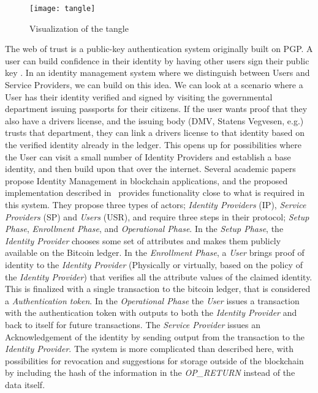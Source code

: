 \begin{figure}[h]
    \centering
    \texttt{[image: tangle]}
    \caption{Visualization of the tangle \cite{IOTA_Whitepaper}}
    \label{fig:tangle}
\end{figure}
The web of trust is a public-key authentication system originally built on PGP. A user can build confidence in their identity by having other users sign their public key \cite{Azouvi2017}. In an identity management system where we distinguish between Users and Service Providers, we can build on this idea. We can look at a scenario where a User has their identity verified and signed by visiting the governmental department issuing passports for their citizens. If the user wants proof that they also have a drivers license, and the issuing body (DMV, Statens Vegvesen, e.g.) trusts that department, they can link a drivers license to that identity based on the verified identity already in the ledger. This opens up for possibilities where the User can visit a small number of Identity Providers and establish a base identity, and then build upon that over the internet.
\newpage
Several academic papers propose Identity Management in blockchain applications, and the proposed implementation described in~\cite{Augot2017} provides functionality close to what is required in this system. They propose three types of actors; \textit{Identity Providers} (IP), \textit{Service Providers} (SP) and \textit{Users} (USR), and require three steps in their protocol; \textit{Setup Phase}, \textit{Enrollment Phase}, and \textit{Operational Phase}. In the \textit{Setup Phase}, the \textit{Identity Provider} chooses some set of attributes and makes them publicly available on the Bitcoin ledger. In the \textit{Enrollment Phase}, a \textit{User} brings proof of identity to the \textit{Identity Provider} (Physically or virtually, based on the policy of the \textit{Identity Provider}) that verifies all the attribute values of the claimed identity. This is finalized with a single transaction to the bitcoin ledger, that is considered a \textit{Authentication token}.  In the \textit{Operational Phase} the \textit{User} issues a transaction with the authentication token with outputs to both the \textit{Identity Provider} and back to itself for future transactions. The \textit{Service Provider} issues an Acknowledgement of the identity by sending output from the transaction to the \textit{Identity Provider}. The system is more complicated than described here, with possibilities for revocation and suggestions for storage outside of the blockchain by including the hash of the information in the \textit{OP\_RETURN} instead of the data itself. 

